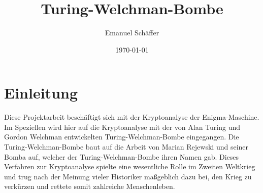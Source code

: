 \documentclass[ngerman, a4paper, footsepline, headsepline]{scrreport}
\begin{document}
	\subject{Kryptoanalyse der Enigma-Maschine durch eine Software-Nachbildung der Turing-Welchman-Bombe}
	\title{Turing-Welchman-Bombe}
	\author{Emanuel Schäffer}
	\date{\today}
	\publishers{RWU--University of Applied Sciences \\ Prof. Dipl.-Math. Ekkehard Löhmann}
	
	\begin{titlepage}
		\maketitle
	\end{titlepage}
	
	
	\tableofcontents
	
	
	\chapter{Einleitung}\label{ch:einleitung}
	Diese Projektarbeit beschäftigt sich mit der Kryptoanalyse der Enigma-Maschine.
	Im Speziellen wird hier auf die Kryptoanalyse mit der von Alan Turing und Gordon Welchman entwickelten \glqq Turing-Welchman-Bombe\grqq{} eingegangen.
	Die Turing-Welchman-Bombe baut auf die Arbeit von Marian Rejewski und seiner \glqq Bomba\grqq{} auf, welcher der Turing-Welchman-Bombe ihren Namen gab.
	Dieses Verfahren zur Kryptoanalyse spielte eine wesentliche Rolle im Zweiten Weltkrieg und trug nach der Meinung vieler Historiker maßgeblich dazu bei, den Krieg zu verkürzen und rettete somit zahlreiche Menschenleben.
	
	
	
	
	
	
	
	
	
\end{document}
